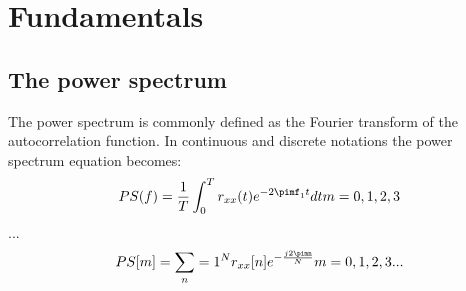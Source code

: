 \chapter{Fundamentals}
\label{chap:fundamentals}

\section{The power spectrum}
The power spectrum is commonly defined as the Fourier transform of the autocorrelation function. In continuous and discrete notations the power spectrum equation becomes:
$$PS(f) = \frac{1}{T}\int_0^Tr_{xx}(t)e^{-2\pimf_1t}dt    m = 0,1,2,3$$
...
$$PS[m] = \sum_n=1^Nr_{xx}[n]e^{-\frac{j2\pimn}{N}}   m = 0,1,2,3...$$

\cite{Sem}